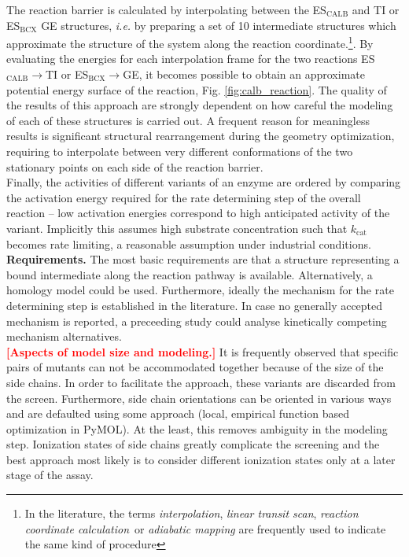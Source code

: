The reaction barrier is calculated by interpolating between the ES$_\text{CALB}$ and TI or ES$_\text{BCX}$ GE structures, \textit{i.e.} by preparing a set of 10 intermediate structures which approximate the structure of the system along the reaction coordinate.\footnote{In the literature, the terms \textit{interpolation}, \textit{linear transit scan}, \textit{reaction coordinate calculation} or \textit{adiabatic mapping} are frequently used to indicate the same kind of procedure}.
By evaluating the energies for each interpolation frame for the two reactions ES$_\text{CALB}\rightarrow$TI or ES$_\text{BCX}\rightarrow$GE, it becomes possible to obtain an approximate potential energy surface of the reaction, Fig. \ref{fig:calb_reaction}.
The quality of the results of this approach are strongly dependent on how careful the modeling of each of these structures is carried out.
A frequent reason for meaningless results is significant structural rearrangement during the geometry optimization, requiring to interpolate between very different conformations of the two stationary points on each side of the reaction barrier.\\
Finally, the activities of different variants of an enzyme are ordered by comparing the activation energy required for the rate determining step of the overall reaction -- low activation energies correspond to high anticipated activity of the variant.
Implicitly this assumes high substrate concentration such that $k_\text{cat}$ becomes rate limiting, a reasonable assumption under industrial conditions.\\
\textbf{Requirements.}
The most basic requirements are that a structure representing a bound intermediate along the reaction pathway is available.
Alternatively, a homology model could be used.
Furthermore, ideally the mechanism for the rate determining step is established in the literature.
In case no generally accepted mechanism is reported, a preceeding study could analyse kinetically competing mechanism alternatives.\\
\textcolor{red}{\textbf{[Aspects of model size and modeling.]}}
It is frequently observed that specific pairs of mutants can not be accommodated together because of the size of the side chains.
In order to facilitate the approach, these variants are discarded from the screen.
Furthermore, side chain orientations can be oriented in various ways and are defaulted using some approach (local, empirical function based optimization in PyMOL).
At the least, this removes ambiguity in the modeling step.
Ionization states of side chains greatly complicate the screening and the best approach most likely is to consider different ionization states only at a later stage of the assay.\\
